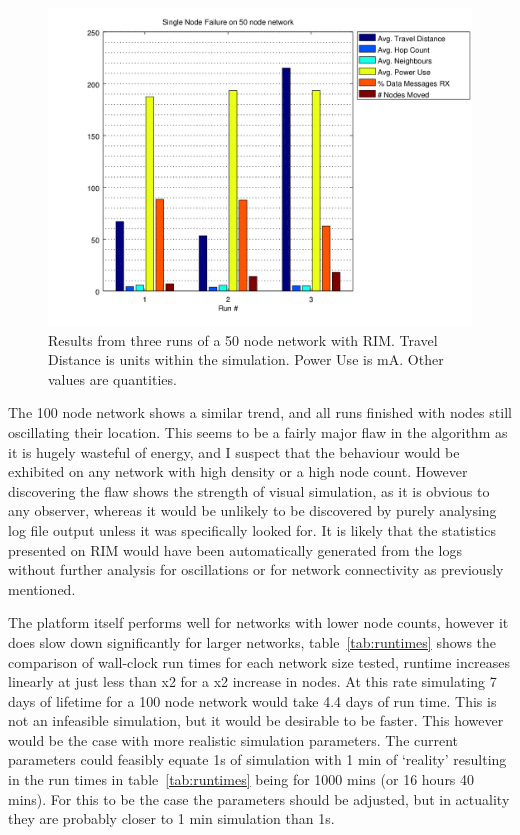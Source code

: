 \documentclass[authoryearcitations]{UoYCSproject}
\begin{document}
\begin{figure}
 \centering
    \includegraphics[width=\textwidth]{figures/singlefail_50node.png}
    \caption[Results from three runs of a 50 node network with RIM.]{Results from three runs of a 50 node network with RIM. Travel Distance is units within the simulation. Power Use is mA. Other values are quantities.}
    \label{fig:singlefail_50node}
\end{figure}

The 100 node network shows a similar trend, and all runs finished with nodes still oscillating their location. This seems to be a fairly major flaw in the algorithm as it is hugely wasteful of energy, and I suspect that the behaviour would be exhibited on any network with high density or a high node count. However discovering the flaw shows the strength of visual simulation, as it is obvious to any observer, whereas it would be unlikely to be discovered by purely analysing log file output unless it was specifically looked for. It is likely that the statistics presented on RIM would have been automatically generated from the logs without further analysis for oscillations or for network connectivity as previously mentioned.

The platform itself performs well for networks with lower node counts, however it does slow down significantly for larger networks, table~\ref{tab:runtimes} shows the comparison of wall-clock run times for each network size tested, runtime increases linearly at just less than x2 for a x2 increase in nodes. At this rate simulating 7 days of lifetime for a 100 node network would take 4.4 days of run time. This is not an infeasible simulation, but it would be desirable to be faster. This however would be the case with more realistic simulation parameters. The current parameters could feasibly equate 1s of simulation with 1 min of `reality' resulting in the run times in table~\ref{tab:runtimes} being for 1000 mins (or 16 hours 40 mins). For this to be the case the parameters should be adjusted, but in actuality they are probably closer to 1 min simulation than 1s.
\end{document}
